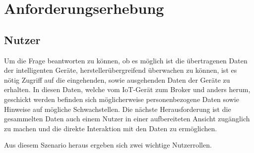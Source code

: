 \chapter{Anforderungserhebung}

\section{Nutzer}
    Um die Frage beantworten zu können, ob es möglich ist die übertragenen Daten der intelligenten Geräte, herstellerübergreifend überwachen zu können, ist es nötig Zugriff auf die eingehenden, sowie ausgehenden Daten der Geräte zu erhalten. In diesen Daten, welche vom \ac{IoT}-Gerät zum Broker und anders herum, geschickt werden befinden sich möglicherweise personenbezogene Daten sowie Hinweise auf mögliche Schwachstellen.
    Die nächste Herausforderung ist die gesammelten Daten auch einem Nutzer in einer aufbereiteten Ansicht zugänglich zu machen und die direkte Interaktion mit den Daten zu ermöglichen.

    Aus diesem Szenario heraus ergeben sich zwei wichtige Nutzerrollen.
    
